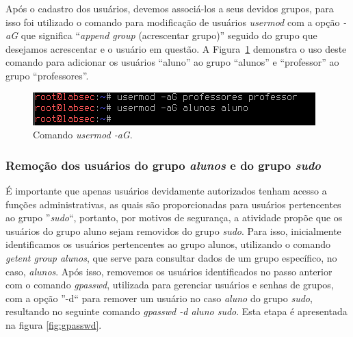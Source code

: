 \documentclass[
  12pt,				%
  oneside,   	        %
  a4paper,			%
  english,			%
  french,				%
  spanish,			%
  brazil,				%
  ]{pacotes/abntex2}
\begin{document}
Após o cadastro dos usuários, devemos associá-los a seus devidos grupos, para isso foi utilizado o comando para modificação de usuários \textit{usermod} com a opção \textit{-aG} que significa ``\textit{append group} (acrescentar grupo)'' seguido do grupo que desejamos acrescentar e o usuário em questão. A Figura~\ref{fig:usermod} demonstra o uso deste comando para adicionar os usuários ``aluno'' ao grupo ``alunos'' e ``professor'' ao grupo ``professores''. 

\begin{figure}[H]
  \centering
  \includegraphics[scale=0.8]{figuras/usermod.png}
  \caption{Comando \textit{usermod -aG}.}
  \label{fig:usermod}
\end{figure}

\subsubsection{Remoção dos usuários do grupo \textit{alunos} e do grupo \textit{sudo}}
É importante que apenas usuários devidamente autorizados tenham acesso a funções administrativas, as quais são proporcionadas para usuários pertencentes ao grupo ''\textit{sudo}``, portanto, por motivos de segurança, a atividade propõe que os usuários do grupo aluno sejam removidos do grupo \textit{sudo}. Para isso, inicialmente identificamos os usuários pertencentes ao grupo alunos, utilizando o comando \textit{getent group alunos}, que serve para consultar dados de um grupo específico, no caso, \textit{alunos}. Após isso, removemos os usuários identificados no passo anterior com o comando \textit{gpasswd}, utilizada para gerenciar usuários e senhas de grupos, com a opção ''-d`` para remover um usuário no caso \textit{aluno} do grupo \textit{sudo}, resultando no seguinte comando \textit{gpasswd -d aluno sudo}. Esta etapa é apresentada na figura \ref{fig:gpasswd}.
\end{document}
